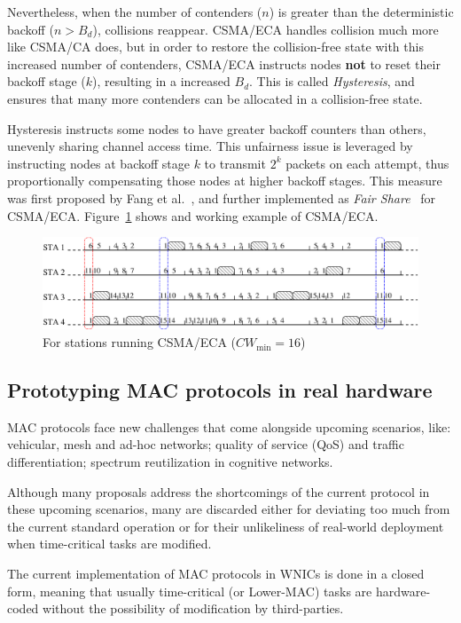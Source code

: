 Nevertheless, when the number of contenders ($n$) is greater than the deterministic backoff ($n>B_{d}$), collisions reappear. CSMA/ECA handles collision much more like CSMA/CA does, but in order to restore the collision-free state with this increased number of contenders, CSMA/ECA instructs nodes {\bfseries not} to reset their backoff stage ($k$), resulting in a increased $B_{d}$. This is called \emph{Hysteresis}, and ensures that many more contenders can be allocated in a collision-free state.

Hysteresis instructs some nodes to have greater backoff counters than others, unevenly sharing channel access time. This unfairness issue is leveraged by instructing nodes at backoff stage $k$ to transmit $2^{k}$ packets on each attempt, thus proportionally compensating those nodes at higher backoff stages. This measure was first proposed by Fang et al.~\cite{L_MAC2}, and further implemented as \emph{Fair Share}~\cite{research2standards} for CSMA/ECA. Figure~\ref{fig:csmaECA} shows and working example of CSMA/ECA.

\begin{figure}[htbp]
  \centering
  \includegraphics[width=\linewidth]{csma_eca_different_backoff_short.eps}
  \caption{For stations running CSMA/ECA ($CW_{\min}=16$)
  \label{fig:csmaECA}}
\end{figure}

\subsection{Prototyping MAC protocols in real hardware}
MAC protocols face new challenges that come alongside upcoming scenarios, like: vehicular, mesh and ad-hoc networks; quality of service (QoS) and traffic differentiation; spectrum reutilization in cognitive networks. 

Although many proposals address the shortcomings of the current protocol in these upcoming scenarios, many are discarded either for deviating too much from the current standard operation or for their unlikeliness of real-world deployment when time-critical tasks are modified.

The current implementation of MAC protocols in WNICs is done in a closed form, meaning that usually time-critical (or Lower-MAC) tasks are hardware-coded without the possibility of modification by third-parties.

